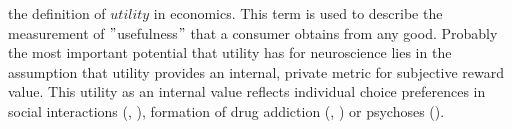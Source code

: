 the definition of $utility$ in economics. This term is used to describe the measurement of $"$usefulness$"$ that a consumer obtains from any good. Probably the most important potential that utility has for neuroscience lies in the assumption that utility provides an internal, private metric for subjective reward value. This utility as an internal value reflects individual choice preferences in social interactions (\cite{Ungless2004b}, \cite{Walum}), formation of drug addiction (\cite{Nestler}, \cite{Hyman}) or psychoses (\cite{Kapur}).

